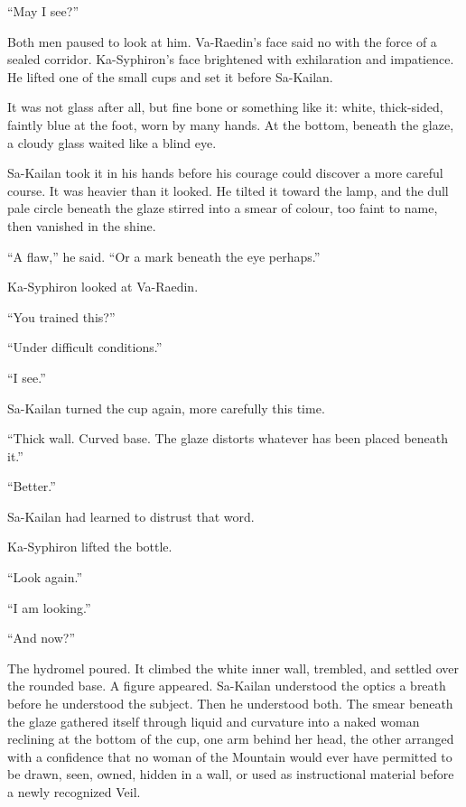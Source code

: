 “May I see?”\par

Both men paused to look at him.
Va-Raedin’s face said no with the force of a sealed corridor.
Ka-Syphiron’s face brightened with exhilaration and impatience.
He lifted one of the small cups and set it before Sa-Kailan.\par

It was not glass after all, but fine bone or something like it: white, thick-sided, faintly blue at the foot, worn by many hands.
At the bottom, beneath the glaze, a cloudy glass waited like a blind eye.\par

Sa-Kailan took it in his hands before his courage could discover a more careful course.
It was heavier than it looked.
He tilted it toward the lamp, and the dull pale circle beneath the glaze stirred into a smear of colour, too faint to name, then vanished in the shine.\par

“A flaw,” he said.
“Or a mark beneath the eye perhaps.”\par

Ka-Syphiron looked at Va-Raedin.\par

“You trained this?”\par
“Under difficult conditions.”\par
“I see.”\par

Sa-Kailan turned the cup again, more carefully this time.\par

“Thick wall.
Curved base.
The glaze distorts whatever has been placed beneath it.”\par
“Better.”\par

Sa-Kailan had learned to distrust that word.\par

Ka-Syphiron lifted the bottle.\par

“Look again.”\par
“I am looking.”\par
“And now?”\par

The hydromel poured.
It climbed the white inner wall, trembled, and settled over the rounded base.
A figure appeared.
Sa-Kailan understood the optics a breath before he understood the subject.
Then he understood both.
The smear beneath the glaze gathered itself through liquid and curvature into a naked woman reclining at the bottom of the cup, one arm behind her head, the other arranged with a confidence that no woman of the Mountain would ever have permitted to be drawn, seen, owned, hidden in a wall, or used as instructional material before a newly recognized Veil.\par

